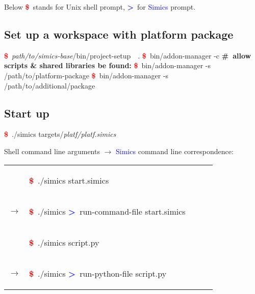 \documentclass[8pt]{extarticle}
\newenvironment{code}[1][]{%
\begin{prebox}[#1]\obeylines}{%
\end{prebox}}
\newenvironment{codem}[1][\linewidth]{%
\begin{minipage}{#1}%
\begin{prebox}\obeylines}{%
\end{prebox}%
\end{minipage}}
\newenvironment{code9}{\begin{codem}[0.9\linewidth]}{\end{codem}}
\newcommand{\prompt}{\textcolor{red}{\textbf{\$}\ }}
\newcommand{\sprompt}{\textcolor{blue}{\textbf{>}\ }}
\newcommand{\cmt}[1]{\textcolor{Sepia}{\textbf{\#\ #1}}}
\newcommand{\p}[1]{\textit{\large#1}}
\newcommand{\Simics}{\textcolor{blue}{Simics}}
\begin{document}
\begin{multicols*}{3}
    Below \prompt stands for Unix shell prompt, \sprompt for \Simics{} prompt.

\subsection{Set up a workspace with platform package}
    \begin{code}
        \prompt \p{path/to/simics-base}/bin/project-setup\ \ .
        \prompt bin/addon-manager -c
        \cmt{allow scripts \& shared libraries be found:}
        \prompt bin/addon-manager -s /path/to/platform-package
        \prompt bin/addon-manager -s /path/to/additional/package
    \end{code}

\subsection{Start up}
    \begin{code}
        \prompt ./simics targets/\p{platf/platf.simics}
    \end{code}

    
    Shell command line arguments $\longrightarrow$ \Simics{} command line 
        correspondence:

    \begin{tabular}{lp{0.9\linewidth}}
        &
        \begin{code9}
            \prompt ./simics start.simics
        \end{code9}
        \vspace{0.05cm}
        \\
        $\longrightarrow$ &
        \begin{code9}
            \prompt ./simics
            \sprompt run-command-file start.simics
        \end{code9}
        \vspace{0.2cm}
        \\

        & \begin{code9}
            \prompt ./simics script.py
        \end{code9}
        \vspace{0.05cm}
        \\
        $\longrightarrow$ &
        \begin{code9}
            \prompt ./simics
            \sprompt run-python-file script.py
        \end{code9}
        \vspace{0.2cm}
        \\


\end{tabular}
\end{multicols*}
\end{document}

